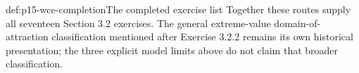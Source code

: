 \begin{proofboundary}{def:p15-wce-completion}{The completed exercise list}
Together these routes supply all seventeen Section 3.2 exercises.
The general extreme-value domain-of-attraction classification
mentioned after Exercise 3.2.2 remains its own historical
presentation; the three explicit model limits above do not
claim that broader classification.
\end{proofboundary}
